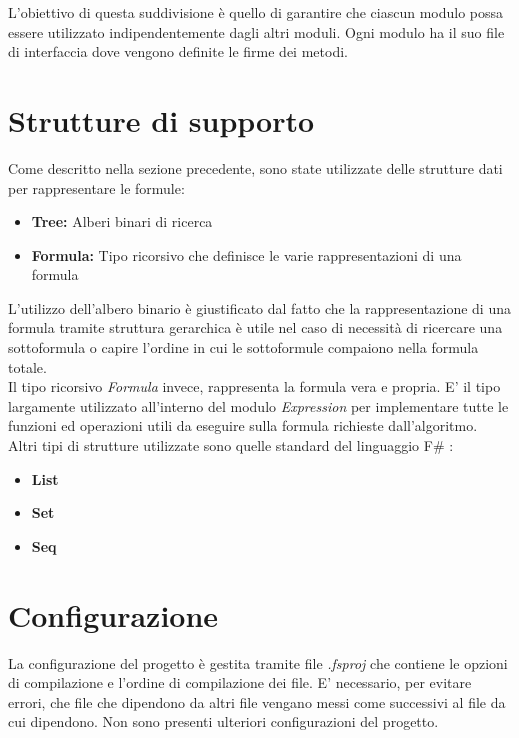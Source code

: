 \documentclass[\main/tesi.tex]{subfiles}
\begin{document}
L'obiettivo di questa suddivisione è quello di garantire che ciascun modulo possa essere utilizzato indipendentemente dagli altri moduli.
Ogni modulo ha il suo file di interfaccia dove vengono definite le firme dei metodi.

\section{Strutture di supporto}
Come descritto nella sezione precedente, sono state utilizzate delle strutture dati per rappresentare le formule:
\begin{itemize}
    \item \textbf{Tree:} Alberi binari di ricerca
    \item \textbf{Formula:} Tipo ricorsivo che definisce le varie rappresentazioni di una formula
\end{itemize}
L'utilizzo dell'albero binario è giustificato dal fatto che la rappresentazione di una formula tramite struttura gerarchica è utile nel caso di necessità di ricercare una sottoformula o capire l'ordine in cui le sottoformule compaiono nella formula totale. \\
Il tipo ricorsivo \textit{Formula} invece, rappresenta la formula vera e propria. E' il tipo largamente utilizzato all'interno del modulo \textit{Expression} per implementare tutte le funzioni ed operazioni utili da eseguire sulla formula richieste dall'algoritmo. \\
Altri tipi di strutture utilizzate sono quelle standard del linguaggio F\# \cite{fsharp}:
\begin{itemize}
    \item \textbf{List}
    \item \textbf{Set}
    \item \textbf{Seq}
\end{itemize}

\section{Configurazione}
La configurazione del progetto è gestita tramite file \textit{.fsproj} che contiene le opzioni di compilazione e l'ordine di compilazione dei file. E' necessario, per evitare errori, che file che dipendono da altri file vengano messi come successivi al file da cui dipendono.
Non sono presenti ulteriori configurazioni del progetto.
\end{document}
